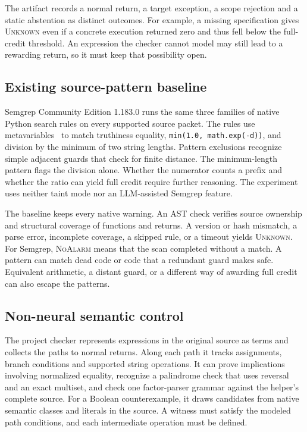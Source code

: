 \documentclass[sigconf]{acmart}
\newcommand{\Unknown}{\textsc{Unknown}}
\newcommand{\NoAlarm}{\textsc{NoAlarm}}
\begin{document}
The artifact records a normal return, a target exception, a scope rejection and a static abstention as distinct outcomes. For example, a missing specification gives \Unknown{} even if a concrete execution returned zero and thus fell below the full-credit threshold. An expression the checker cannot model may still lead to a rewarding return, so it must keep that possibility open.

\subsection{Existing source-pattern baseline}

Semgrep Community Edition 1.183.0 runs the same three families of native Python search rules on every supported source packet. The rules use metavariables~\cite{semgrep} to match truthiness equality, \texttt{min(1.0, math.exp(-d))}, and division by the minimum of two string lengths. Pattern exclusions recognize simple adjacent guards that check for finite distance. The minimum-length pattern flags the division alone. Whether the numerator counts a prefix and whether the ratio can yield full credit require further reasoning. The experiment uses neither taint mode nor an LLM-assisted Semgrep feature.

The baseline keeps every native warning. An AST check verifies source ownership and structural coverage of functions and returns. A version or hash mismatch, a parse error, incomplete coverage, a skipped rule, or a timeout yields \Unknown{}. For Semgrep, \NoAlarm{} means that the scan completed without a match. A pattern can match dead code or code that a redundant guard makes safe. Equivalent arithmetic, a distant guard, or a different way of awarding full credit can also escape the patterns.

\subsection{Non-neural semantic control}

The project checker represents expressions in the original source as terms and collects the paths to normal returns. Along each path it tracks assignments, branch conditions and supported string operations. It can prove implications involving normalized equality, recognize a palindrome check that uses reversal and an exact multiset, and check one factor-parser grammar against the helper's complete source. For a Boolean counterexample, it draws candidates from native semantic classes and literals in the source. A witness must satisfy the modeled path conditions, and each intermediate operation must be defined.
\end{document}
